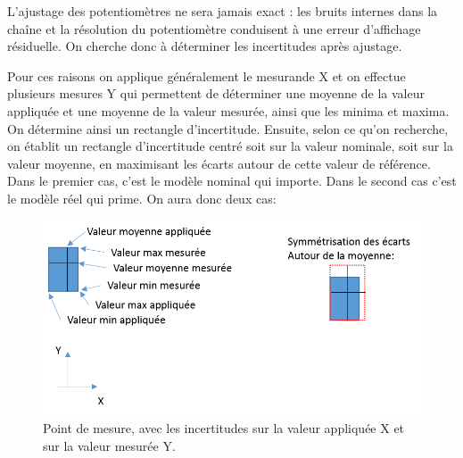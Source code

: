 \documentclass[main.tex]{subfiles}
\begin{document}
L'ajustage des potentiomètres ne sera jamais exact : les bruits internes dans la chaîne et  la résolution du potentiomètre conduisent à une erreur d'affichage résiduelle. On cherche donc à déterminer les incertitudes après ajustage.

Pour ces raisons on applique généralement le mesurande X et on effectue plusieurs mesures Y qui permettent de déterminer une moyenne de la valeur appliquée et une moyenne de la valeur mesurée, ainsi que les minima et maxima. On détermine ainsi un rectangle d'incertitude. Ensuite, selon ce qu'on recherche, on établit un rectangle d'incertitude centré soit sur la valeur nominale, soit sur la valeur moyenne, en maximisant les écarts autour de cette valeur de référence. Dans le premier cas, c'est le modèle nominal qui importe. Dans le second cas c'est le modèle réel qui prime. On aura donc deux cas:

\begin{center}
\end{center}

\begin{figure}
    \centering
    \includegraphics[width=12cm]{assets/figures/3_3_explications.PNG}
    \caption{Point de mesure, avec les incertitudes sur la valeur appliquée X et sur la valeur mesurée Y.}
    \label{fig:Ajustage_symmetrisation_detail}
\end{figure}
\end{document}

